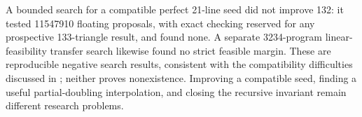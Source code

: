 A bounded search for a compatible perfect 21-line seed did not improve
132: it tested 11547910 floating proposals, with exact checking reserved
for any prospective 133-triangle result, and found none.  A separate
3234-program linear-feasibility transfer search likewise found no strict
feasible margin.  These are reproducible negative search results,
consistent with the compatibility difficulties discussed in
\cite{parpalakutkin2026}; neither proves nonexistence.  Improving a
compatible seed, finding a useful partial-doubling interpolation, and
closing the recursive invariant remain different research problems.
